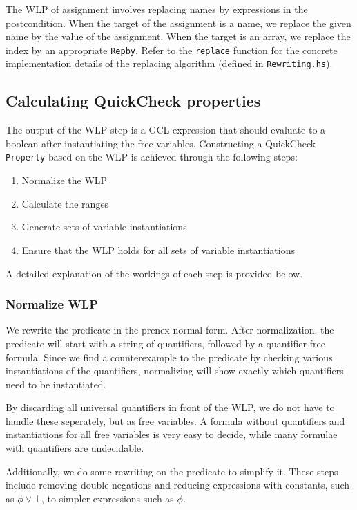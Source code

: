 \documentclass[a4paper]{article}
\begin{document}
The WLP of assignment involves replacing names by expressions in the postcondition.
When the target of the assignment is a name, we replace the given name by the value
of the assignment. When the target is an array, we replace the index by an appropriate
\texttt{Repby}. Refer to the \texttt{replace} function for the concrete implementation
details of the replacing algorithm (defined in \texttt{Rewriting.hs}).

\subsection{Calculating QuickCheck properties}

The output of the WLP step is a GCL expression that should evaluate to a boolean
after instantiating the free variables. Constructing a QuickCheck \texttt{Property}
based on the WLP is achieved through the following steps:

\begin{enumerate}
\item Normalize the WLP
\item Calculate the ranges
\item Generate sets of variable instantiations
\item Ensure that the WLP holds for all sets of variable instantiations
\end{enumerate}

A detailed explanation of the workings of each step is provided below.

\subsubsection*{Normalize WLP}

We rewrite the predicate in the prenex normal form. After normalization, the
predicate will start with a string of quantifiers, followed by a quantifier-free
formula. Since we find a counterexample to the predicate by checking various
instantiations of the quantifiers, normalizing will show exactly which
quantifiers need to be instantiated.

By discarding all universal quantifiers in front of the WLP, we do not have to
handle these seperately, but as free variables. A formula without quantifiers
and instantiations for all free variables is very easy to decide, while many
formulae with quantifiers are undecidable.

Additionally, we do some rewriting on the predicate to simplify it. These steps
include removing double negations and reducing expressions with constants,
such as $\phi \vee \bot$, to simpler expressions such as $\phi$.
\end{document}
